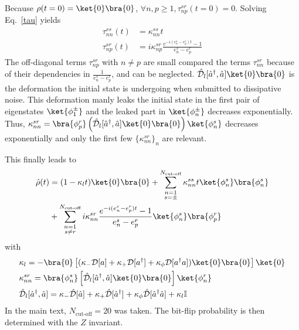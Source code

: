 Because $\rho(t=0)=\ket{0} \bra{0}$, $\forall n,p \ge 1, \tau_{np}^{sr}(t=0) = 0$. Solving Eq.~\eqref{tau} yields
\begin{equation}
    \begin{split}
        \tau_{nn}^{ss}(t) &= \kappa_{nn}^{ss} t \\
        \tau_{np}^{sr}(t) &= i\kappa_{np}^{sr} \frac{e^{-i(e^s_n- e^r_p)t}-1}{e^s_n- e^r_p}
    \end{split}
\end{equation}
The off-diagonal terms $\tau_{np}^{sr}$ with $n \neq p$ are small compared the terms $\tau_{nn}^{sr}$ because of their dependencies in $\frac{1}{e^s_n- e^r_p}$, and can be neglected. $\mathcal{\hat D}_l[\hat a^\dagger,\hat a] \ket{0}\bra{0}$ is the deformation the initial state is undergoing when submitted to dissipative noise. This deformation manly leaks the initial state in the first pair of eigenstates $\ket{{\phi}_1^\pm}$ and the leaked part in $\ket{{\phi}_n^\pm}$ decreases exponentially. Thus, $\kappa_{nn}^{sr} = \bra{{\phi}_p^r} \left(\mathcal{\hat D}_l[\hat a^\dagger,\hat a] \ket{0}\bra{0} \right) \ket{{\phi}_n^s}$ decreases exponentially and only the first few $\{\kappa_{nn}^{sr}\}_n$ are relevant.

This finally leads to
\begin{equation}
    \begin{split}
        \hat \rho(t) &= (1 - \kappa_l t)\ket{0}\bra{0} + \sum^{N_\text{cut-off}}_{\substack{n=1 \\s=\pm}} \kappa_{nn}^{ss} t \ket{{\phi}_n^s} \bra{{\phi}_n^s} \\
        & + \sum^{N_\text{cut-off}}_{\substack{n=1 \\s \ne r}} i\kappa_{nn}^{sr} \frac{e^{-i(e^s_n- e^r_p)t}-1}{e^s_n- e^r_p} \ket{{\phi}_n^s} \bra{{\phi}_p^r} 
    \end{split}
\end{equation}
with 
\begin{equation*}
    \begin{split}
        &\kappa_l = - \bra{0} \left[ ( \kappa_- \mathcal{D}[a] + \kappa_+ \mathcal{D}[a^\dagger] + \kappa_\phi \mathcal{D}[a^\dagger a] )\ket{0}\bra{0} \right]\ket{0} \\
        &\kappa_{nn}^{sr} = \bra{{\phi}_n^s} \left[ \mathcal{\hat D}_l[\hat a^\dagger,\hat a]\ket{0}\bra{0} \right]  \ket{{\phi}_n^r} \\
        &\mathcal{\hat D}_l[\hat a^\dagger,\hat a] = \kappa_- \mathcal{\hat D}[\hat a] + \kappa_+ \mathcal{\hat D}[\hat a^\dagger] + \kappa_\phi \mathcal{\hat D}[\hat a^\dagger \hat a] + \kappa_l \mathbb{I}
    \end{split}
\end{equation*}
In the main text, $N_\text{cut-off} = 20$ was taken. The bit-flip probability is then determined with the $Z$ invariant. \\

